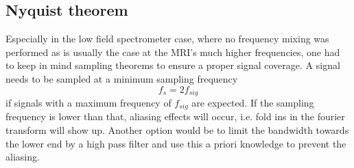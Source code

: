             \subsection{Nyquist theorem}
            Especially in the low field spectrometer case, where no frequency mixing was performed as is usually the case at the MRI's much higher frequencies, one had to keep in mind sampling theorems to ensure a proper signal coverage. A signal needs to be sampled at a minimum sampling frequency \cite{shannon_mathematical_1948}
                \begin{equation}
                    f_{s} = 2 f_{sig}
                \end{equation}
                if signals with a maximum frequency of $f_{sig}$ are expected. If the sampling frequency is lower than that, aliasing effects will occur, i.e. fold ins in the fourier transform will show up.
                Another option would be to limit the bandwidth towards the lower end by a high pass filter and use this a priori knowledge to prevent the aliasing.
